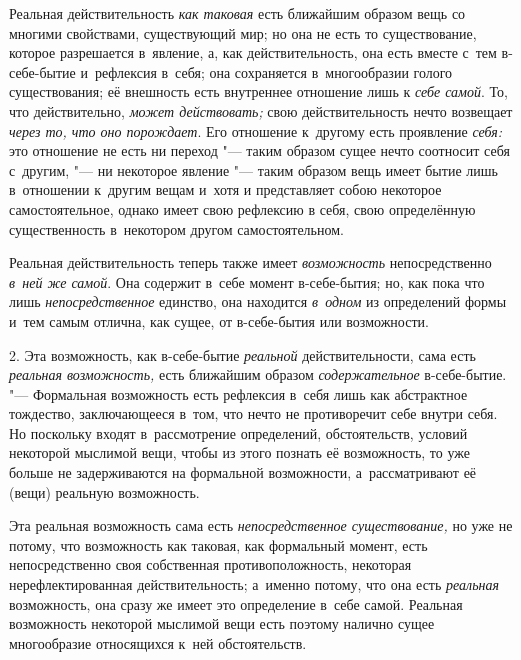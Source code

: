 Реальная действительность {\em как таковая} есть
ближайшим образом вещь со многими свойствами, существующий мир; но она не
есть то существование, которое разрешается в~явление, а, как
действительность, она есть вместе с~тем в-себе-бытие и~рефлексия в~себя;
она сохраняется в~многообразии голого существования; её внешность есть
внутреннее отношение лишь к {\em себе самой}. То, что
действительно, {\em может действовать;} свою
действительность нечто возвещает {\em через то, что оно
порождает}. Его отношение к~другому есть проявление
{\em себя:} это отношение не есть ни переход "--- таким образом сущее
нечто соотносит себя с~другим, "--- ни некоторое явление "--- таким
образом вещь имеет бытие лишь в~отношении к~другим вещам и~хотя и
представляет собою некоторое самостоятельное, однако имеет свою рефлексию
в себя, свою определённую существенность в~некотором другом самостоятельном.

Реальная действительность теперь также имеет {\em возможность} непосредственно
{\em в~ней же самой}. Она содержит в~себе момент в-себе-бытия; но, как
пока что лишь {\em непосредственное} единство, она находится {\em в~одном}
из определений формы и~тем самым отлична, как сущее, от в-себе-бытия или
возможности.

2. Эта возможность, как в-себе-бытие {\em реальной}
действительности, сама есть {\em реальная возможность,}
есть ближайшим образом {\em содержательное}
в-себе-бытие. "--- Формальная возможность есть рефлексия в~себя лишь как
абстрактное тождество, заключающееся в~том, что нечто не противоречит себе
внутри себя. Но поскольку входят в~рассмотрение определений, обстоятельств,
условий некоторой мыслимой вещи, чтобы из этого познать её возможность, то
уже больше не задерживаются на формальной возможности, а~рассматривают её
(вещи) реальную возможность.

Эта реальная возможность сама есть {\em непосредственное
существование,} но уже не потому, что возможность как таковая, как
формальный момент, есть непосредственно своя собственная противоположность,
некоторая нерефлектированная действительность; а~именно потому, что она
есть {\em реальная} возможность, она сразу же имеет это
определение в~себе самой. Реальная возможность некоторой мыслимой вещи есть
поэтому налично сущее многообразие относящихся к~ней обстоятельств.

